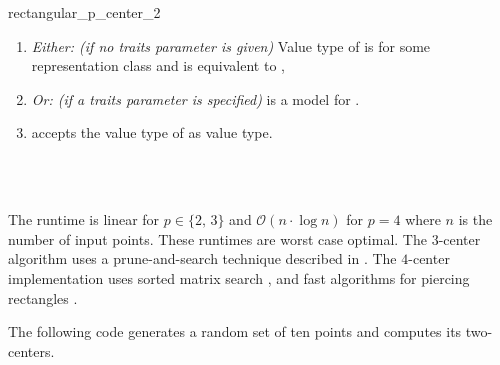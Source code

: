 \begin{ccRefFunction}{rectangular_p_center_2}
  \ccRequire
  \begin{enumerate}
  \item \textit{Either: (if no traits parameter is given)} Value type
    of  is  for some
    representation class  and  is equivalent to
    ,
  \item \textit{Or: (if a traits parameter is specified)} 
    is a model for .
  \item {} accepts the value type of
     as value type.
  \end{enumerate}  
  
  \ccSeeAlso
  \\
  \\
  
  \ccImplementation The runtime is linear for $p \in \{2,\,3\}$ and
  $\mathcal{O}(n \cdot \log n)$ for $p = 4$ where $n$ is the number of
  input points. These runtimes are worst case optimal. The $3$-center
  algorithm uses a prune-and-search technique described in
  \cite{cgal:h-slacr-99}.  The $4$-center implementation uses sorted matrix
  search \cite{fj-fkppc-83}, \cite{fj-gsrsm-84} and fast algorithms for
  piercing rectangles \cite{sw-rpppp-96}.
  
  \ccExample The following code generates a random set of ten points
  and computes its two-centers.

\end{ccRefFunction}

